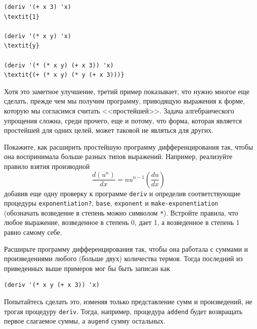 \begin{Verbatim}[fontsize=\small]
(deriv '(+ x 3) 'x)
\textit{1}

(deriv '(* x y) 'x)
\textit{y}

(deriv '(* (* x y) (+ x 3)) 'x)
\textit{(+ (* x y) (* y (+ x 3)))}
\end{Verbatim}
Хотя это заметное улучшение, третий пример показывает, что нужно
многое еще сделать, прежде чем мы получим программу, приводящую
выражения к форме, которую мы согласимся считать <<простейшей>>.
Задача алгебраического упрощения сложна, среди прочего, еще и потому,
что форма, которая является простейшей для одних целей, может таковой
не являться для других.
\begin{exercise}{2.56}\label{EX2.56}%
%
Покажите, как расширить простейшую программу
дифференцирования так, чтобы она воспринимала больше разных типов 
выражений.  Например, реализуйте правило взятия производной
$$
  \frac{d(u^n)}{dx} = n u^{n-1} (\frac{du}{dx})
$$
добавив еще одну проверку к программе {\tt deriv} и определив
соответствующие процедуры {\tt exponentiation?},
{\tt base}, {\tt exponent} и
{\tt make-exponentiation} (обозначать возведение в степень
можно символом {\tt **}).  Встройте правила, что любое выражение,
возведенное в степень 0, дает 1, а возведенное в степень 1 равно
самому себе.
\end{exercise}
\begin{exercise}{2.57}\label{EX2.57}%
Расширьте программу дифференцирования так, чтобы она
работала с суммами и произведениями любого (больше двух) количества
термов.  Тогда последний из приведенных выше примеров мог бы быть записан 
как

\begin{Verbatim}[fontsize=\small]
(deriv '(* x y (+ x 3)) 'x)
\end{Verbatim}
Попытайтесь сделать это, изменяя только представление сумм и
произведений, не трогая процедуру {\tt deriv}.  Тогда,
например, процедура {\tt addend} будет возвращать первое
слагаемое суммы, а {\tt augend} сумму остальных.
\end{exercise}
